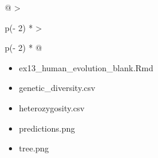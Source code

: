 \documentclass[
]{book}
\begin{document}
\begin{longtable}[]{@{}
  >{\raggedright\arraybackslash}p{(\columnwidth - 2\tabcolsep) * }
  >{\raggedright\arraybackslash}p{(\columnwidth - 2\tabcolsep) * }@{}}
\begin{minipage}[t]{\linewidth}
\begin{itemize}
\item
  ex13\_human\_evolution\_blank.Rmd
\item
  genetic\_diversity.csv
\item
  heterozygosity.csv
\item
  predictions.png
\item
  tree.png
\end{itemize}
\end{minipage} \\
\bottomrule
\end{longtable}
\end{document}
